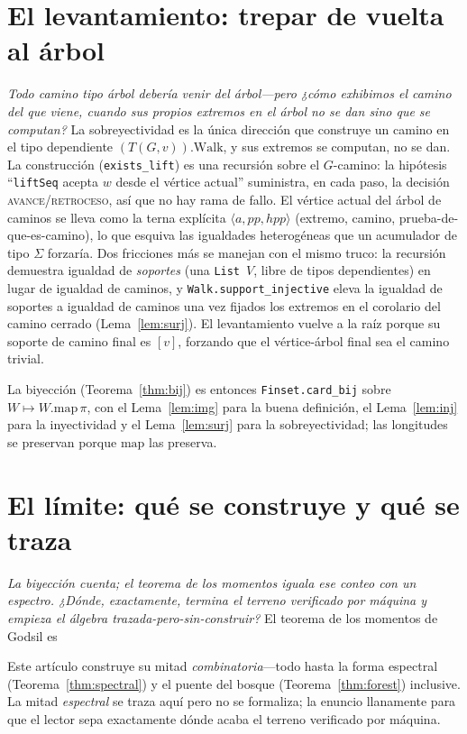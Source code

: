 \documentclass[11pt]{article}
\newcommand{\lean}[1]{\texttt{#1}}
\newcommand{\keyeq}[1]{\begin{center}\keybox{$\displaystyle #1$}\end{center}}
\begin{document}
\section{El levantamiento: trepar de vuelta al \'arbol}
\label{sec:surj}

\emph{Todo camino tipo \'arbol deber\'ia venir del \'arbol---pero ¿c\'omo exhibimos el camino del que
viene, cuando sus propios extremos en el \'arbol no se dan sino que se computan?} La sobreyectividad es
la \'unica direcci\'on que construye un camino en el tipo dependiente $(T(G,v)).\mathrm{Walk}$, y sus
extremos se computan, no se dan. La construcci\'on (\lean{exists\_lift}) es una recursi\'on sobre el
$G$-camino: la hip\'otesis ``\lean{liftSeq} acepta $w$ desde el v\'ertice actual'' suministra, en cada
paso, la decisi\'on \textsc{avance}/\textsc{retroceso}, as\'i que no hay rama de fallo. El v\'ertice
actual del \'arbol de caminos se lleva como la terna expl\'icita $\langle a, pp, hpp\rangle$ (extremo,
camino, prueba-de-que-es-camino), lo que esquiva las igualdades heterog\'eneas que un acumulador de tipo
$\Sigma$ forzar\'ia. Dos fricciones m\'as se manejan con el mismo truco: la recursi\'on demuestra
igualdad de \emph{soportes} (una \lean{List}~$V$, libre de tipos dependientes) en lugar de igualdad de
caminos, y \lean{Walk.support\_injective} eleva la igualdad de soportes a igualdad de caminos una vez
fijados los extremos en el corolario del camino cerrado (Lema~\ref{lem:surj}). El levantamiento vuelve a
la ra\'iz porque su soporte de camino final es $[v]$, forzando que el v\'ertice-\'arbol final sea el
camino trivial.

La biyecci\'on (Teorema~\ref{thm:bij}) es entonces \lean{Finset.card\_bij} sobre $W\mapsto
W.\mathrm{map}\,\pi$, con el Lema~\ref{lem:img} para la buena definici\'on, el Lema~\ref{lem:inj} para la
inyectividad y el Lema~\ref{lem:surj} para la sobreyectividad; las longitudes se preservan porque
$\mathrm{map}$ las preserva.

\section{El l\'imite: qu\'e se construye y qu\'e se traza}
\label{sec:boundary}

\emph{La biyecci\'on cuenta; el teorema de los momentos iguala ese conteo con un espectro. ¿D\'onde,
exactamente, termina el terreno verificado por m\'aquina y empieza el \'algebra trazada-pero-sin-construir?}
El teorema de los momentos de Godsil es
\keyeq{p_k(G)\;=\;\sum_i\theta_i^{k}\;=\;\mathrm{treeLikeWalkCount}(G,k).}
Este art\'iculo construye su mitad \emph{combinatoria}---todo hasta la forma espectral
(Teorema~\ref{thm:spectral}) y el puente del bosque (Teorema~\ref{thm:forest}) inclusive. La mitad
\emph{espectral} se traza aqu\'i pero no se formaliza; la enuncio llanamente para que el lector sepa
exactamente d\'onde acaba el terreno verificado por m\'aquina.
\end{document}

